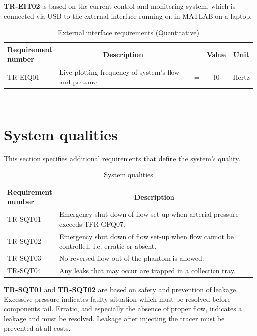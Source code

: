 \textbf{TR-EIT02} is based on the current control and monitoring system, which is connected via USB to the external interface running on in MATLAB on a laptop.

\begin{table}[H]
\caption{External interface requirements (Quantitative)}
\label{tab:extint_quan}
\begin{tabular}{l|p{65mm}ccp{20mm}|}
	\makecell[l]{\textbf{Requirement} \\  \textbf{number}} & \multicolumn{1}{c}{\textbf{Description}} & \multicolumn{1}{c}{ } & \multicolumn{1}{c}{\textbf{Value}} & \multicolumn{1}{c}{\textbf{Unit}} \\
	\hline	
	TR-EIQ01 &  Live plotting frequency of system's flow and pressure. & = &  10 & Hertz \\
	\cline{2-5}
\end{tabular} \\
\end{table}

\section{System qualities}
This section specifies additional requirements that define the system's quality.
\begin{table} [H]
\caption{System qualities}
\label{tab:sysqual}
\begin{tabular}{l|p{120mm}|}
	\makecell[l]{\textbf{Requirement} \\ \textbf{number}} & \multicolumn{1}{c}{\textbf{Description}}\\
	\hline
	TR-SQT01 & Emergency shut down of flow set-up when arterial pressure exceeds TFR-GFQ07. \\ 
	TR-SQT02 & Emergency shut down of flow set-up when flow cannot be controlled, i.e. erratic or absent. \\
	TR-SQT03 & No reversed flow out of the phantom is allowed. \\
	TR-SQT04 & Any leaks that may occur are trapped in a collection tray. \\
	\cline{2-2}
\end{tabular}
\end{table}

\textbf{TR-SQT01} and \textbf{TR-SQT02} are based on safety and prevention of leakage. Excessive pressure indicates faulty situation which must be resolved before components fail. Erratic, and especially the absence of proper flow, indicates a leakage and must be resolved. Leakage after injecting the tracer must be prevented at all costs.

